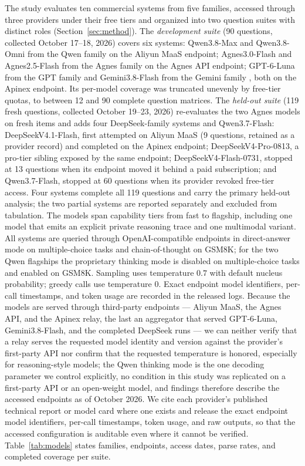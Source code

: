 The study evaluates ten commercial systems from five families, accessed through three providers under their free tiers and organized into two question suites with distinct roles (Section~\ref{sec:method}). The \emph{development suite} (90 questions, collected October 17--18, 2026) covers six systems: Qwen3.8-Max and Qwen3.8-Omni from the Qwen family \citep{yang2025qwen3,qwen2024qwen} on the Aliyun MaaS endpoint; Agnes3.0-Flash and Agnes2.5-Flash from the Agnes family \citep{agnesai2026} on the Agnes API endpoint; GPT-6-Luna from the GPT family \citep{openai2023gpt4,openai2025gpt5} and Gemini3.8-Flash from the Gemini family \citep{google2026gemini38}, both on the Apinex endpoint. Its per-model coverage was truncated unevenly by free-tier quotas, to between 12 and 90 complete question matrices. The \emph{held-out suite} (119 fresh questions, collected October 19--23, 2026) re-evaluates the two Agnes models on fresh items and adds four DeepSeek-family systems \citep{deepseek2026api} and Qwen3.7-Flash: DeepSeekV4.1-Flash, first attempted on Aliyun MaaS (9 questions, retained as a provider record) and completed on the Apinex endpoint; DeepSeekV4-Pro-0813, a pro-tier sibling exposed by the same endpoint; DeepSeekV4-Flash-0731, stopped at 13 questions when its endpoint moved it behind a paid subscription; and Qwen3.7-Flash, stopped at 60 questions when its provider revoked free-tier access. Four systems complete all 119 questions and carry the primary held-out analysis; the two partial systems are reported separately and excluded from tabulation. The models span capability tiers from fast to flagship, including one model that emits an explicit private reasoning trace and one multimodal variant. All systems are queried through OpenAI-compatible endpoints in direct-answer mode on multiple-choice tasks and chain-of-thought on GSM8K; for the two Qwen flagships the proprietary thinking mode is disabled on multiple-choice tasks and enabled on GSM8K. Sampling uses temperature $0.7$ with default nucleus probability; greedy calls use temperature $0$. Exact endpoint model identifiers, per-call timestamps, and token usage are recorded in the released logs. Because the models are served through third-party endpoints --- Aliyun MaaS, the Agnes API, and the Apinex relay, the last an aggregator that served GPT-6-Luna, Gemini3.8-Flash, and the completed DeepSeek runs --- we can neither verify that a relay serves the requested model identity and version against the provider's first-party API nor confirm that the requested temperature is honored, especially for reasoning-style models; the Qwen thinking mode is the one decoding parameter we control explicitly, no condition in this study was replicated on a first-party API or an open-weight model, and findings therefore describe the accessed endpoints as of October 2026. We cite each provider's published technical report or model card where one exists and release the exact endpoint model identifiers, per-call timestamps, token usage, and raw outputs, so that the accessed configuration is auditable even where it cannot be verified. Table~\ref{tab:models} states families, endpoints, access dates, parse rates, and completed coverage per suite.

